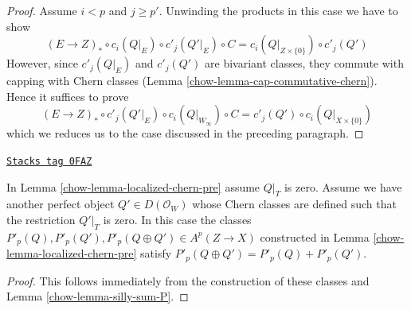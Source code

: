 \begin{proof}
\medskip\noindent
Assume $i < p$ and $j \geq p'$. Unwinding the products
in this case we have to show
$$
(E \to Z)_* \circ c_i(Q|_E) \circ c'_j(Q'|_E) \circ C =
c_i(Q|_{Z \times \{0\}}) \circ c'_j(Q')
$$
However, since $c'_j(Q|_E)$ and $c'_j(Q')$ are
bivariant classes, they commute with capping with Chern classes
(Lemma \ref{chow-lemma-cap-commutative-chern}). Hence it suffices to prove
$$
(E \to Z)_* \circ c'_j(Q'|_E) \circ c_i(Q|_{W_\infty}) \circ C =
c'_j(Q') \circ c_i(Q|_{X \times \{0\}})
$$
which we reduces us to the case discussed in the preceding paragraph.
\end{proof}

\begin{lemma}
\label{chow-lemma-localized-chern-pre-sum-P}
\href{https://stacks.math.columbia.edu/tag/0FAZ}{\texttt{Stacks tag 0FAZ}}

In Lemma \ref{chow-lemma-localized-chern-pre} assume $Q|_T$ is zero.
Assume we have another perfect object $Q' \in D(\mathcal{O}_W)$
whose Chern classes are defined such that the restriction $Q'|_T$ is zero.
In this case the classes
$P'_p(Q), P'_p(Q'), P'_p(Q \oplus Q') \in A^p(Z \to X)$
constructed in Lemma \ref{chow-lemma-localized-chern-pre}
satisfy $P'_p(Q \oplus Q') = P'_p(Q) + P'_p(Q')$.
\end{lemma}

\begin{proof}

This follows immediately from the construction of these
classes and Lemma \ref{chow-lemma-silly-sum-P}.
\end{proof}

